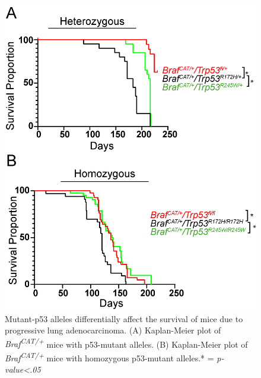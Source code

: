 \begin{figure}
\hypertarget{fig:04}{%
\centering
\includegraphics[width=1\textwidth,height=\textheight]{images/p53_3.png}
\caption{Mutant-p53 alleles differentially affect the survival of mice due to progressive lung adenocarcinoma. (A) Kaplan-Meier plot of \emph{Braf\textsuperscript{CAT/+}} mice with p53-mutant alleles. (B) Kaplan-Meier plot of \emph{Braf\textsuperscript{CAT/+}} mice with homozygous p53-mutant alleles.* = \emph{p-value\textless.05}}\label{fig:04}
}
\end{figure}

